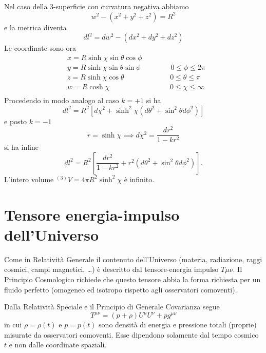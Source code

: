 Nel caso della 3-superficie con curvatura negativa abbiamo
\begin{equation}
  w^2 - (x^2+y^2+z^2) = R^2
\end{equation}
e la metrica diventa
\begin{equation}
  dl^2 = dw^2 - (dx^2+dy^2+dz^2)
\end{equation}
Le coordinate sono ora
\begin{equation}
  \begin{split}
    & x=R \sinh \chi \sin \theta \cos \phi~~~~~~~~~~~~~~~~  \\
    & y=R \sinh \chi \sin \theta \sin \phi~~~~~~~~~~~~~~~~~~~0\le \phi  \le 2 \pi \\
    & z=R \sinh \chi \cos \theta~~~~~~~~~~~~~~~~~~~~~~~~~~~~~0\le \theta \le \pi \\
    & w=R \cosh \chi ~~~~~~~~~~~~~~~~~~~~~~~~~~~~~~~~~~~~~  ~0\le \chi \le \infty    \\
  \end{split}
\end{equation}
Procedendo in modo analogo al caso $k=+1$ si ha
\begin{equation}
  dl^2 = R^2 \left[ d \chi^2 + \sinh^2 \chi \left( d \theta^2 + \sin^2 \theta d
      \phi^2 \right) \right]
\end{equation}
e posto $k=-1$
\begin{equation}
  r= \sinh \chi \implies d \chi^2 = \frac{dr^2}{1-kr^2}
\end{equation}
si ha infine
\begin{equation}
  dl^2 = R^2 \left[ \frac{dr^2} {1-kr^2} + r^2 (d \theta^2+\sin^2 \theta
    d\phi^2) \right].
\end{equation}
L'intero volume $^{(3)}V= 4 \pi R^2 \sinh^2 \chi$ è infinito.

\section{Tensore energia-impulso dell'Universo}

Come in Relatività Generale il contenuto dell'Universo (materia, radiazione,
raggi cosmici, campi magnetici, \dots) è descritto dal tensore-energia impulso
$T{\mu \nu}$.  Il Principio Cosmologico richiede che questo tensore abbia la
forma richiesta per un fluido perfetto (omogeneo ed isotropo rispetto agli
osservatori comoventi).

Dalla Relatività Speciale e il Principio di Generale Covarianza segue
\begin{equation}
  T^{\mu \nu} = ( p+ \rho) U^{\mu} U^{\nu} + p g^{\mu \nu}
\end{equation}
in cui $\rho= \rho(t)$ e $p= p(t)$ sono densità di energia e pressione totali
(proprie) misurate da osservatori comoventi.  Esse dipendono solamente dal tempo
cosmico $t$ e non dalle coordinate spaziali.

